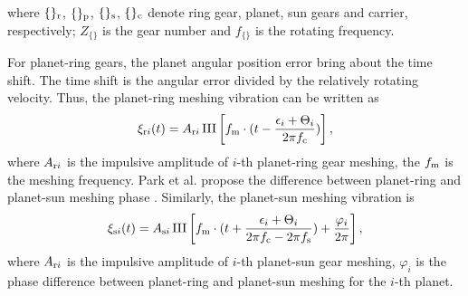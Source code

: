 \documentclass[a4paper,fleqn]{cas-sc}%
\begin{document}
where $\{\}_{\rm r}$, $\{\}_{\rm p}$, $\{\}_{\rm s}$, $\{\}_{\rm c}$ denote ring gear, planet, sun gears and carrier, respectively; $Z_{\{\}}$ is the gear number and $f_{\{\}}$ is the rotating frequency. 
\par For planet-ring gears, the planet angular position error bring about the time shift. The time shift is the angular error divided by the relatively rotating velocity. Thus, the planet-ring meshing vibration can be written as
\begin{equation}
    \xi_{{\rm r}i}(t)=A_{{\rm r}i}\operatorname{III}\left[f_{\rm m} \cdot (t-\frac{\epsilon_i+\Theta_i}{2 \pi f_{\rm c}})\right],\label{eq:planet-ring_meshing}
\end{equation}
where $A_{{\rm r}i}$ is the impulsive amplitude of $i$-th planet-ring gear meshing, the $f_{\rm m}$ is the meshing frequency. Park et al. propose the difference between planet-ring and planet-sun meshing phase \cite{Parker2004}. Similarly, the planet-sun meshing vibration is
\begin{equation}
    \xi_{{\rm s}i}(t)=A_{{\rm s}i} \operatorname{III}\left[f_{\rm m} \cdot (t + \frac{\epsilon_i+\Theta_i}{2 \pi f_{\rm c}- 2 \pi f_{\rm s}})+ \frac{\varphi_i}{2 \pi} \right],\label{eq:planet-sun_meshing}
\end{equation}
where $A_{{\rm r}i}$ is the impulsive amplitude of $i$-th planet-sun gear meshing, $\varphi_i$ is the phase difference between planet-ring and planet-sun meshing for the $i$-th planet.
\end{document}
